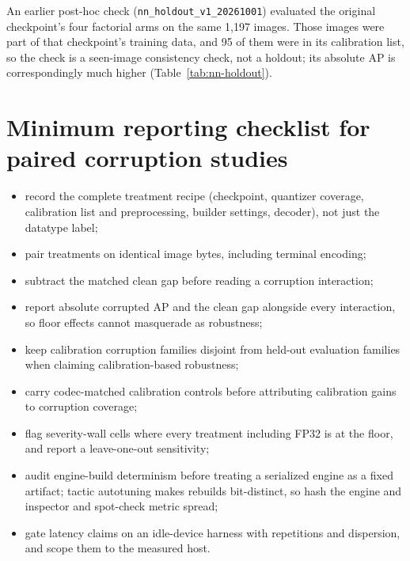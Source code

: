 \documentclass[10pt]{article}
\newcommand{\Jclean}{\mathrm{J95}}
\begin{document}
An earlier post-hoc check (\texttt{nn\_holdout\_v1\_20261001}) evaluated the
original checkpoint's four factorial arms on the same 1,197 images. Those
images were part of that checkpoint's training data, and 95 of them were in
its calibration list, so the check is a seen-image consistency check, not a
holdout; its absolute AP is correspondingly much higher
(Table~\ref{tab:nn-holdout}).

\begin{table}[htbp]
\centering\scriptsize
\caption{Original KITTI checkpoint: factorial arms on the 1,197 final images
(seen in training; 95 also in the calibration list) and on the selection set.
Plug-in AP without intervals. ``Orig.\ clean'': original clean image;
``$\Jclean$'': JPEG quality-95 codec control.}
\label{tab:nn-holdout}
{\setlength{\tabcolsep}{3pt}}
\end{table}

\section{Minimum reporting checklist for paired corruption studies}

\begin{itemize}
  \item record the complete treatment recipe (checkpoint, quantizer coverage,
        calibration list and preprocessing, builder settings, decoder), not
        just the datatype label;
  \item pair treatments on identical image bytes, including terminal encoding;
  \item subtract the matched clean gap before reading a corruption
        interaction;
  \item report absolute corrupted AP and the clean gap alongside every
        interaction, so floor effects cannot masquerade as robustness;
  \item keep calibration corruption families disjoint from held-out
        evaluation families when claiming calibration-based robustness;
  \item carry codec-matched calibration controls before attributing
        calibration gains to corruption coverage;
  \item flag severity-wall cells where every treatment including FP32 is at
        the floor, and report a leave-one-out sensitivity;
  \item audit engine-build determinism before treating a serialized engine as
        a fixed artifact; tactic autotuning makes rebuilds bit-distinct, so
        hash the engine and inspector and spot-check metric spread;
  \item gate latency claims on an idle-device harness with repetitions and
        dispersion, and scope them to the measured host.
\end{itemize}
\end{document}
